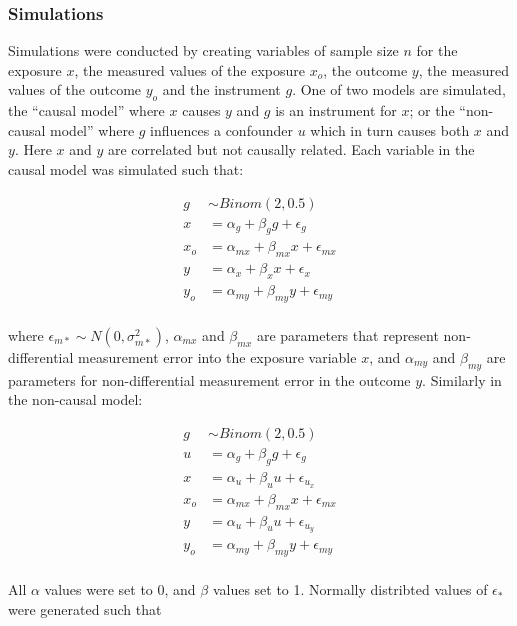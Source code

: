 \documentclass[]{article}
\begin{document}
\subsubsection{Simulations}\label{simulations}

Simulations were conducted by creating variables of sample size \(n\)
for the exposure \(x\), the measured values of the exposure \(x_o\), the
outcome \(y\), the measured values of the outcome \(y_o\) and the
instrument \(g\). One of two models are simulated, the ``causal model''
where \(x\) causes \(y\) and \(g\) is an instrument for \(x\); or the
``non-causal model'' where \(g\) influences a confounder \(u\) which in
turn causes both \(x\) and \(y\). Here \(x\) and \(y\) are correlated
but not causally related. Each variable in the causal model was
simulated such that:

\[
\begin{aligned}
g & \sim Binom(2, 0.5) \\
x & = \alpha_g + \beta_g g + \epsilon_g \\
x_o & = \alpha_{mx} + \beta_{mx} x + \epsilon_{mx} \\
y & = \alpha_x + \beta_x x + \epsilon_x \\
y_o & = \alpha_{my} + \beta_{my} y + \epsilon_{my} \\
\end{aligned}
\]

where \(\epsilon_{m*} \sim N(0, \sigma^2_{m*})\), \(\alpha_{mx}\) and
\(\beta_{mx}\) are parameters that represent non-differential
measurement error into the exposure variable \(x\), and \(\alpha_{my}\)
and \(\beta_{my}\) are parameters for non-differential measurement error
in the outcome \(y\). Similarly in the non-causal model:

\[
\begin{aligned}
g & \sim Binom(2, 0.5) \\
u & = \alpha_g + \beta_g g + \epsilon_g \\
x & = \alpha_u + \beta_u u + \epsilon_{u_x} \\
x_o & = \alpha_{mx} + \beta_{mx} x + \epsilon_{mx} \\
y & = \alpha_u + \beta_u u + \epsilon_{u_y} \\
y_o & = \alpha_{my} + \beta_{my} y + \epsilon_{my} \\
\end{aligned}
\]

All \(\alpha\) values were set to 0, and \(\beta\) values set to 1.
Normally distribted values of \(\epsilon_*\) were generated such that
\end{document}
